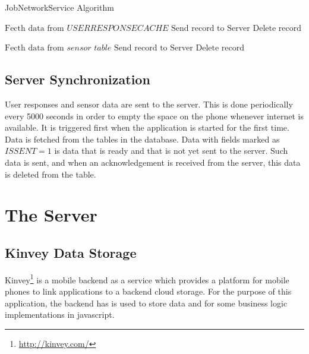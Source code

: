 \begin{algorithm}
\caption{JobNetworkService Algorithm}\label{nextday}
\begin{algorithmic}[1]
\State $ \text{Fecth data from } \textit{USERRESPONSECACHE}$
  \State $\text{Send record to Server}$
  \State $\text{Delete record}$  
  \EndIf
  \EndIf
 	\EndFor

 	 \State $ \text{Fecth data from } \textit{sensor table}$
  \State $\text{Send record to Server}$
  \State $\text{Delete record}$  
  \EndIf
  \EndIf
 	\EndFor
	
 	\EndFor
\EndProcedure
\end{algorithmic}
\end{algorithm}


\subsection{Server Synchronization} \label{job}

User responses and sensor data are sent to the server. This is done periodically every 5000 seconds in order to empty the space on the phone whenever internet is available. It is triggered first when the application is started for the first time. Data is fetched from the tables in the database. Data with fields marked as $\textit{ISSENT}=1$ is data that is ready and that is not yet sent to the server. Such data is sent, and when an acknowledgement is received from the server, this data is deleted from the table.

\section{The Server}

\subsection{Kinvey Data Storage}

Kinvey\footnote{\url{http://kinvey.com/}} is a mobile backend as a service which provides a platform for mobile phones to link applications to a backend cloud storage. For the purpose of this application, the backend has is used to store data and for some business logic implementations in javascript.

